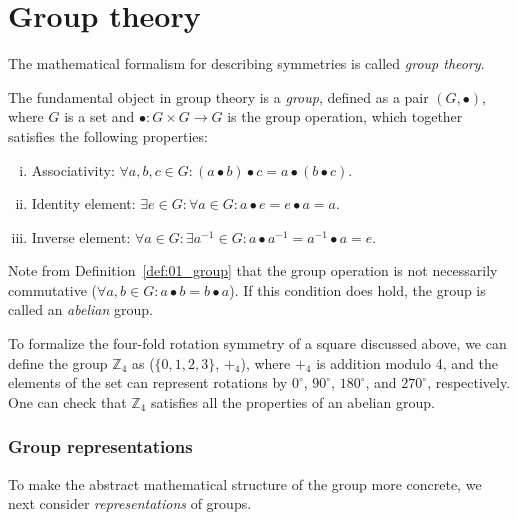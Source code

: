 \section{Group theory}
\label{sec:01_symmetries_gt}

The mathematical formalism for describing symmetries is called \textit{group theory}.

\begin{definition}
\label{def:01_group}
The fundamental object in group theory is a \textit{group}, defined as a pair $(G, \bullet)$, where $G$ is a set and $\bullet: G \times G \rightarrow G$ is the group operation, which together satisfies the following properties:
\begin{enumerate}[i)]
	\item Associativity: $\forall a, b, c \in G: (a \bullet b) \bullet c = a \bullet (b \bullet c)$.
	\item Identity element: $\exists e \in G: \forall a \in G: a \bullet e = e \bullet a = a$.
	\item Inverse element: $\forall a \in G: \exists a^{-1} \in G: a \bullet a^{-1} = a^{-1} \bullet a = e$.
\end{enumerate}
\end{definition}

\begin{definition}
\label{def:01_abelian}
Note from Definition~\ref{def:01_group} that the group operation is not necessarily commutative ($\forall a, b \in G: a \bullet b = b \bullet a$).
If this condition does hold, the group is called an \textit{abelian} group.
\end{definition}

\begin{example}
\label{example:01_square}
To formalize the four-fold rotation symmetry of a square discussed above, we can define the group $\mathbb Z_4$  as ($\{0, 1, 2, 3\}$, $+_4$), where $+_4$ is addition modulo 4, and the elements of the set can represent rotations by $0^{\circ}$, $90^{\circ}$, $180^{\circ}$, and $270^{\circ}$, respectively.
One can check that $\mathbb Z_4$ satisfies all the properties of an abelian group.
\end{example}

\subsubsection{Group representations}

To make the abstract mathematical structure of the group more concrete, we next consider \textit{representations} of groups.

